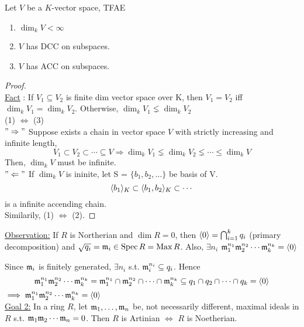 \begin{lemma} \label{vector-space-dim-acc-dcc-relation}
  Let $V$ be a $K$-vector space, TFAE
  \begin{enumerate}[(1)]
    \item $\dim_k V < \infty$
    \item $V$ has DCC on subspaces.
    \item $V$ has ACC on subspaces.
  \end{enumerate}

  \begin{proof} $ $ \\
    \underline{Fact} : If $V_1 \subseteq V_2$ is finite dim vector space over K, then $V_1 = V_2$
    iff $\dim_k V_1 = \dim_k V_2$. Otherwise, $\dim_k V_1 \lneq \dim_k V_2$\\
    (1) $\Leftrightarrow$ (3) \\
    $"\Rightarrow"$ Suppose exists a chain in vector space $V$ with strictly increasing and infinite
    length,
    $$
      V_1 \subset V_2 \subset \cdots \subseteq V \Rightarrow \dim_k V_1 \lneq \dim_k V_2 \lneq \cdots 
      \leq \dim_k V
    $$
    Then, $\dim_k V$ must be infinite. \\
    $"\Leftarrow"$ If $\dim_k V$ is ininite, let S = $\{b_1, b_2, \dots \}$ be basis of V.
    $$
      \langle b_1\rangle_K \subset \langle b_1 , b_2\rangle_K \subset \cdots
    $$
    is a infinite accending chain.\\
    Similarily, (1) $\Leftrightarrow$ (2).
  \end{proof}
\end{lemma}

\underline{Observation:} If $R$ is Northerian and $\dim R = 0$, then
$\langle0\rangle = \bigcap_{i=1}^k q_i$ (primary decomposition) and
$\sqrt{q_i} = \mathfrak{m}_i \in \operatorname{Spec} R = \operatorname{Max} R$. Also,  $\exists n_i $ 
$\mathfrak{m}_1^{n_1}\mathfrak{m}_2^{n_2} \dotsm \mathfrak{m}_k^{n_k} = \langle0\rangle$


Since $\mathfrak{m}_i$ is finitely generated, $\exists n_i$ s.t.
$\mathfrak{m}_i^{n_i} \subseteq q_i$. Hence 
$$
\mathfrak{m}_1^{n_1}\mathfrak{m}_2^{n_2} \dotsm \mathfrak{m}_k^{n_k} = 
\mathfrak{m}_1^{n_1} \cap \mathfrak{m}_2^{n_2} \cap \dotsm \cap \mathfrak{m}_k^{n_k} \subseteq
q_1 \cap q_2 \cap \dotsm \cap q_k = \langle0\rangle \\
$$
$\implies \mathfrak{m}_1^{n_1}\mathfrak{m}_2^{n_2} \dotsm \mathfrak{m}_k^{n_k} = \langle0\rangle$ \\

\underline{Goal 2:} In a ring $R$, let $\mathfrak{m}_1, \dots, \mathfrak{m}_n$ be,
not necessarily different, maximal ideals in $R$ s.t.
$\mathfrak{m}_1\mathfrak{m}_2 \dotsm \mathfrak{m}_n = 0$. Then $R$ is Artinian $\iff$ $R$ is Noetherian.

